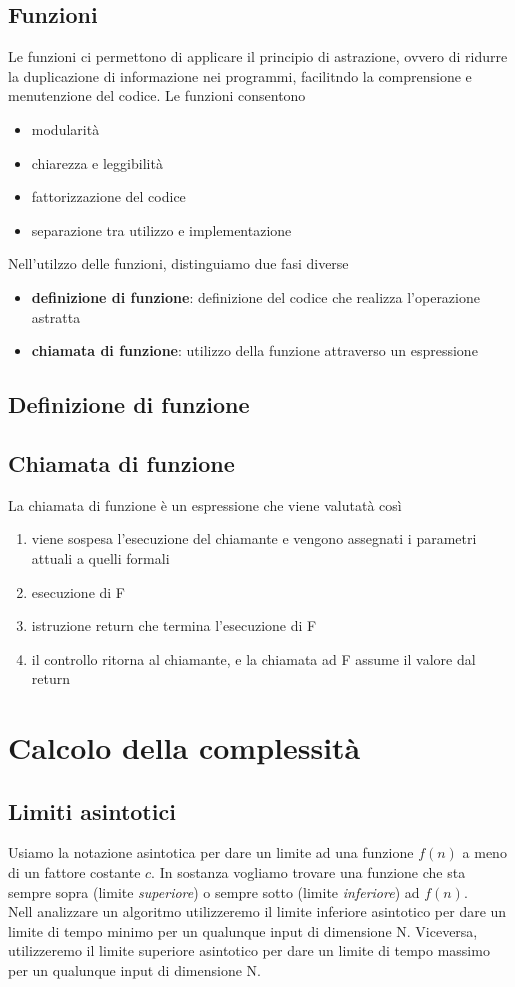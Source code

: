 \documentclass{article}
\begin{document}
\subsection{Funzioni}
Le funzioni ci permettono di applicare il principio di astrazione, ovvero di ridurre la duplicazione di informazione nei programmi, facilitndo la comprensione e menutenzione del codice. Le funzioni consentono
\begin{itemize}
  \item modularità
  \item chiarezza e leggibilità
  \item fattorizzazione del codice
  \item separazione tra utilizzo e implementazione
\end{itemize}
Nell'utilzzo delle funzioni, distinguiamo due fasi diverse
\begin{itemize}
  \item \textbf{definizione di funzione}: definizione del codice che realizza l'operazione astratta
  \item \textbf{chiamata di funzione}: utilizzo della funzione attraverso un espressione
\end{itemize}
\subsection*{Definizione di funzione}
\subsection*{Chiamata di funzione}
La chiamata di funzione è un espressione che viene valutatà così
\begin{enumerate}
  \item viene sospesa l'esecuzione del chiamante e vengono assegnati i parametri attuali a quelli formali
  \item esecuzione di F
  \item istruzione return che termina l'esecuzione di F
  \item il controllo ritorna al chiamante, e la chiamata ad F assume il valore  dal return
\end{enumerate}

\pagebreak

\section{Calcolo della complessità}
\subsection{Limiti asintotici}
Usiamo la notazione asintotica per dare un limite ad una funzione \(f(n)\) a meno di un fattore costante \(c\). In sostanza vogliamo trovare una funzione che sta sempre sopra (limite \emph{superiore}) o sempre sotto (limite \emph{inferiore}) ad \(f(n)\).\\
Nell analizzare un algoritmo utilizzeremo il limite inferiore asintotico per dare un limite di tempo minimo per un qualunque input di dimensione N. Viceversa, utilizzeremo il limite superiore asintotico per dare un limite di tempo massimo per un qualunque input di dimensione N.
\end{document}
